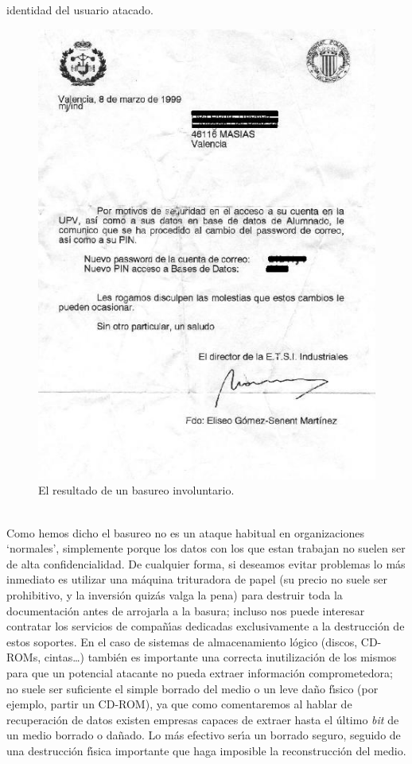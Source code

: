 identidad del usuario atacado.\\
\begin{figure}
\begin{center}
\includegraphics[width=\textwidth]{scav.png}
\caption{El resultado de un basureo involuntario.}
\label{scav}
\end{center}
\end{figure}
\\Como hemos dicho el basureo no es un ataque habitual en organizaciones
`normales', simplemente porque los datos con los que estan trabajan no suelen 
ser de alta confidencialidad. De cualquier forma, si deseamos evitar problemas 
lo m\'as inmediato es utilizar una m\'aquina trituradora de papel (su precio no 
suele ser prohibitivo, y la inversi\'on quiz\'as valga la pena) para destruir 
toda la 
documentaci\'on antes de arrojarla a la basura; incluso nos puede interesar
contratar los servicios de compa\~n\'{\i}as dedicadas exclusivamente a la
destrucci\'on de estos soportes. En el caso de sistemas de almacenamiento 
l\'ogico (discos, CD-ROMs, cintas\ldots) tambi\'en es importante una correcta
inutilizaci\'on de los mismos para que un potencial atacante no pueda extraer
informaci\'on comprometedora; no suele ser suficiente el simple borrado del
medio o un leve da\~no f\'{\i}sico (por ejemplo, partir un CD-ROM), ya que como 
comentaremos al hablar de
recuperaci\'on de datos existen empresas capaces de extraer hasta el \'ultimo
{\it bit} de un medio borrado o da\~nado. Lo m\'as efectivo ser\'{\i}a un
borrado seguro, seguido de una destrucci\'on f\'{\i}sica importante que haga
imposible la reconstrucci\'on del medio.
